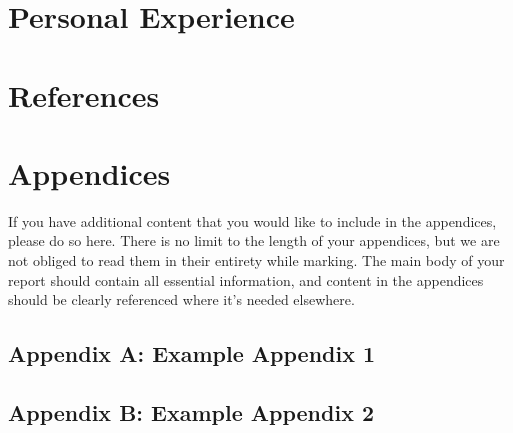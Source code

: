 \documentclass{article}
\begin{document}
\section{Personal Experience}


\section*{References}
\small

\normalsize
\newpage
\section*{Appendices}
If you have additional content that you would like to include in the appendices, please do so here.
There is no limit to the length of your appendices, but we are not obliged to read them in their entirety while marking. The main body of your report should contain all essential information, and content in the appendices should be clearly referenced where it's needed elsewhere.
\subsection*{Appendix A: Example Appendix 1}
\subsection*{Appendix B: Example Appendix 2}
\end{document}
